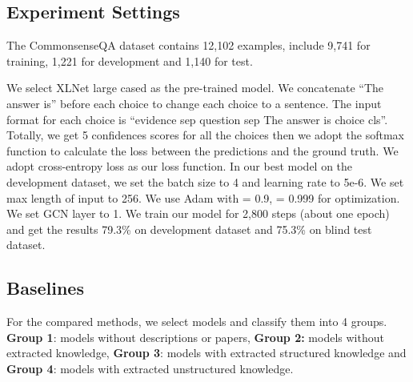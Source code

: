 \documentclass[letterpaper]{article} \usepackage{aaai20}  \usepackage{times}  \usepackage{helvet} \usepackage{courier}  \usepackage[hyphens]{url}  \usepackage{graphicx} \urlstyle{rm} \def\UrlFont{\rm}  \usepackage{graphicx}  \frenchspacing  \setlength{\pdfpagewidth}{8.5in}  \setlength{\pdfpageheight}{11in}
\begin{document}
\subsection{Experiment Settings}
The CommonsenseQA \cite{talmor2019commonsenseqa} dataset contains 12,102 examples, include 9,741 for training, 1,221 for development and 1,140 for test. 

 We select XLNet large cased \cite{xlnet2019yang} as the pre-trained model. We concatenate ``The answer is'' before each choice to change each choice to a sentence. The input format for each choice is ``evidence sep question sep The answer is choice cls''. Totally, we get 5 confidences scores for all the choices then we adopt the softmax function to calculate the loss between the predictions and the ground truth. We adopt cross-entropy loss as our loss function. In our best model on the development dataset, we set the batch size to 4 and learning rate to 5e-6. We set max length of input to 256. We use Adam  \cite{kingma2014adam} with  = 0.9,  = 0.999 for optimization. We set GCN layer to 1. We train our model for 2,800 steps (about one epoch) and get the results 79.3\% on development dataset and 75.3\% on blind test dataset.
 
 \subsection{Baselines}

For the compared methods, we select models and classify them into 4 groups. \textbf{Group 1}: models without descriptions or papers, \textbf{Group 2:} models without extracted knowledge, \textbf{Group 3}: models with extracted structured knowledge and \textbf{Group 4}: models with extracted unstructured knowledge.
\end{document}
